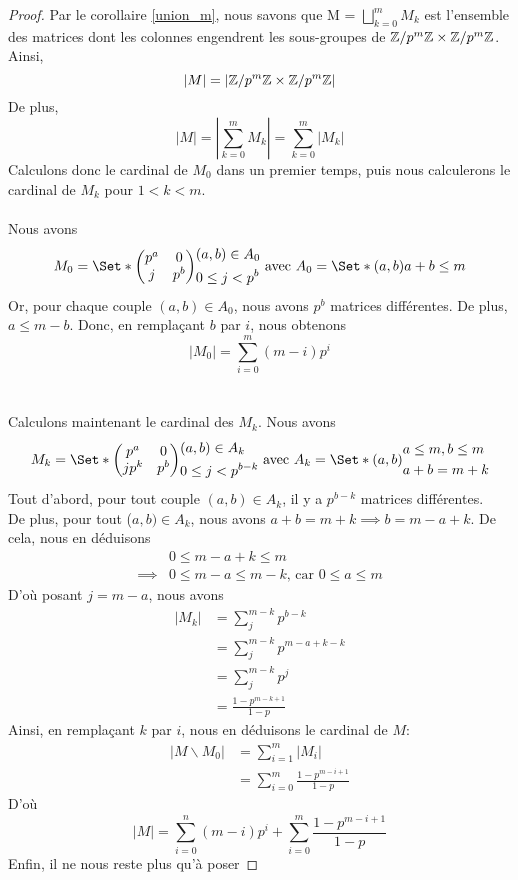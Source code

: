 \documentclass[12pt]{article}
\newcommand{\ZpmZ}{\Z/p^m\Z}
\newcommand{\ZZpm}{\ZpmZ \x \ZpmZ}
\newcommand{\Mz}{\Set*{
	\begin{pmatrix}
		p^a  & 0   \\
		j & p^b
	\end{pmatrix}
}{
	\begin{aligned}
		 & (a, b) \in A_0      \\
		 & 0 \le j < p^{b}
	\end{aligned}
}}
\newcommand{\Mk}{\Set*{
	\begin{pmatrix}
		p^a  & 0   \\
		jp^k & p^b
	\end{pmatrix}
}{
	\begin{aligned}
		 & (a, b) \in A_k      \\
		 & 0 \le j < p^{b - k}
	\end{aligned}
}}
\newcommand{\Az}{\Set*{(a,b)}{ a + b \le m}}
\newcommand{\Ak}{\Set*{
	(a,b)}{
	\begin{aligned}
		 & a \le m, b \le m \\
		 & a + b = m + k
	\end{aligned}
}}
\begin{document}
\begin{proof}
	Par le corollaire \ref{union_m}, nous savons que M = $\bigsqcup\limits_{k = 0}^{m} M_k$
	est l'ensemble des matrices dont les colonnes engendrent les sous-groupes de $\ZZpm$.
	Ainsi,
	$$| M | = |\ZZpm|$$
	De plus,
	$$|M| = |\sum_{k=0}^{m} M_k| = \sum_{k=0}^{m}|M_k|$$
	\indent
	Calculons donc le cardinal de $M_0$ dans un premier temps, puis nous calculerons
	le cardinal de $M_k$ pour $1 < k < m$.\\\vspace*{1cm}\\
	Nous avons $$M_0 =\Mz \text{ avec } A_0 = \Az$$
	Or, pour chaque couple $(a,b) \in A_0$, nous avons $p^b$ matrices différentes.
	De plus, $a \le m - b$. Donc, en remplaçant $b$ par $i$, nous obtenons
	$$ |M_0| = \sum_{i=0}^{m}(m-i)p^i$$
	\\\vspace*{1cm}\\
	Calculons maintenant le cardinal des $M_k$. Nous avons
	$$M_k = \Mk \text{ avec } A_k = \Ak$$
	Tout d'abord, pour tout couple $(a,b) \in A_k$, il y a $p^{ b-k}$ matrices différentes.\\
	De plus, pour tout ($a,b) \in A_k$, nous avons
	$a + b = m + k \implies b = m - a +k$. De cela, nous en déduisons
	\begin{equation*}
		\begin{aligned}
			         & 0 \le m - a + k \le m                             \\
			\implies & 0\le m - a \le m - k \text{, car  } 0 \le a \le m
		\end{aligned}
	\end{equation*}
	D'où posant $j = m - a$, nous avons
	\begin{equation*}
		\begin{split}
			|M_k| &= \sum_{j}^{m - k}p^{b-k}\\
			&= \sum_{j}^{m - k}p^{m - a + k - k}\\
			&= \sum_{j}^{m - k}p^{j}\\
			&= \frac{1 - p^{m-k+1}}{1-p}
		\end{split}
	\end{equation*}
	Ainsi, en remplaçant $k$ par $i$, nous en déduisons le cardinal de $M$:
	\begin{equation*}
		\begin{split}
			|M \backslash M_0| &= \sum_{i=1}^{m}|M_i|\\
			&= \sum_{i=0}^{m}\frac{1 - p^{m-i+1}}{1-p}
		\end{split}
	\end{equation*}
	D'où
	$$|M| = \sum_{i=0}^{n}(m-i)p^i + \sum_{i = 0}^{m}\frac{1- p^{m-i+1}}{1 - p}$$
	Enfin, il ne nous reste plus qu'à poser
\end{proof}
\end{document}

